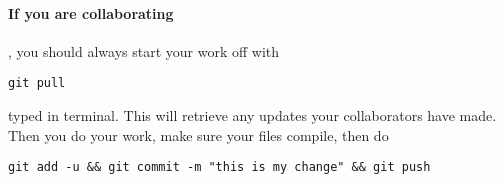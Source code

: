 \documentclass{ximera}
\begin{document}
\paragraph{If you are collaborating}, you should always start your work off
with
\begin{verbatim}
git pull
\end{verbatim}
typed in terminal. This will retrieve any updates your collaborators have made.
Then you do your work, make sure your files compile, then do
\begin{verbatim}
git add -u && git commit -m "this is my change" && git push
\end{verbatim}


\end{document}
